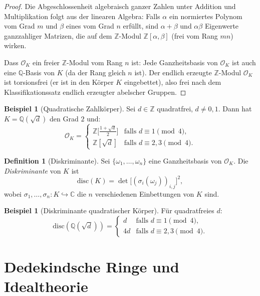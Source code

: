 \documentclass[12pt,a4paper]{amsart}
\theoremstyle{definition}
\newtheorem{definition}[theorem]{Definition}
\newtheorem{example}[theorem]{Beispiel}
\newcommand{\Z}{\mathbb{Z}}
\newcommand{\Q}{\mathbb{Q}}
\newcommand{\C}{\mathbb{C}}
\newcommand{\OK}{\mathcal{O}_K}
\newcommand{\disc}{\mathrm{disc}}
\begin{document}
\begin{proof}
Die Abgeschlossenheit algebraisch ganzer Zahlen unter Addition und
Multiplikation folgt aus der linearen Algebra: Falls $\alpha$ ein normiertes
Polynom vom Grad $m$ und $\beta$ eines vom Grad $n$ erfüllt, sind
$\alpha + \beta$ und $\alpha\beta$ Eigenwerte ganzzahliger Matrizen, die auf
dem $\Z$-Modul $\Z[\alpha,\beta]$ (frei vom Rang $mn$) wirken.

Dass $\OK$ ein freier $\Z$-Modul vom Rang $n$ ist: Jede Ganzheitsbasis
von $\OK$ ist auch eine $\Q$-Basis von $K$ (da der Rang gleich $n$ ist).
Der endlich erzeugte $\Z$-Modul $\OK$ ist torsionsfrei (er ist in den
Körper $K$ eingebettet), also frei nach dem Klassifikationssatz endlich
erzeugter abelscher Gruppen.
\end{proof}

\begin{example}[Quadratische Zahlkörper]
\label{ex:quadratisch}
Sei $d \in \Z$ quadratfrei, $d \ne 0, 1$.  Dann hat $K = \Q(\sqrt{d})$
den Grad $2$ und:
\[
  \OK =
  \begin{cases}
    \Z\bigl[\tfrac{1+\sqrt{d}}{2}\bigr]
    & \text{falls } d \equiv 1 \pmod{4}, \\[4pt]
    \Z[\sqrt{d}]
    & \text{falls } d \equiv 2, 3 \pmod{4}.
  \end{cases}
\]
\end{example}

\begin{definition}[Diskriminante]
\label{def:diskriminante}
Sei $\{\omega_1, \ldots, \omega_n\}$ eine Ganzheitsbasis von $\OK$.
Die \emph{Diskriminante} von $K$ ist
\[
  \disc(K) = \det\bigl[(\sigma_i(\omega_j))_{i,j}\bigr]^2,
\]
wobei $\sigma_1, \ldots, \sigma_n : K \hookrightarrow \C$ die $n$
verschiedenen Einbettungen von $K$ sind.
\end{definition}

\begin{example}[Diskriminante quadratischer Körper]
Für quadratfreies $d$:
\[
  \disc(\Q(\sqrt{d})) =
  \begin{cases}
    d & \text{falls } d \equiv 1 \pmod{4}, \\
    4d & \text{falls } d \equiv 2, 3 \pmod{4}.
  \end{cases}
\]
\end{example}

\section{Dedekindsche Ringe und Idealtheorie}
\end{document}
